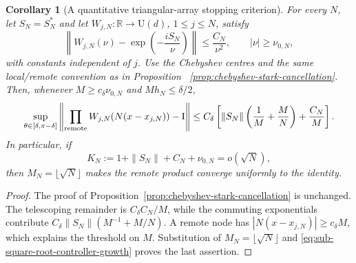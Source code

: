 \documentclass[11pt]{article}
\newtheorem{corollary}[theorem]{Corollary}
\theoremstyle{remark}
\newcommand{\Id}{\mathrm I}
\begin{document}
\begin{corollary}[A quantitative triangular-array stopping criterion]
\label{cor:chebyshev-triangular-array}
For every $N$, let $S_N=S_N^*$ and let
$W_{j,N}:\mathbb R\to\mathrm U(d)$, $1\leq j\leq N$, satisfy
\begin{equation}
 \left\|W_{j,N}(\nu)-\exp\!\left(-\frac{iS_N}{\nu}\right)\right\|
 \leq\frac{C_N}{\nu^2},
 \qquad |\nu|\geq\nu_{0,N},
 \label{eq:triangular-common-stark-tail}
\end{equation}
with constants independent of $j$.  Use the Chebyshev centres and the same
local/remote convention as in Proposition
~\ref{prop:chebyshev-stark-cancellation}.  Then, whenever
$M\geq c_\delta\nu_{0,N}$ and $Mh_N\leq\delta/2$,
\begin{equation}
 \sup_{\theta\in[\delta,\pi-\delta]}
 \left\|
  \prod_{\rm remote}W_{j,N}\!\left(N(x-x_{j,N})\right)-\Id
 \right\|
 \leq
 C_\delta\left[
  \|S_N\|\left(\frac1M+\frac{M}{N}\right)+\frac{C_N}{M}
 \right].
 \label{eq:triangular-chebyshev-remote-bound}
\end{equation}
In particular, if
\begin{equation}
 K_N:=1+\|S_N\|+C_N+\nu_{0,N}=o(\sqrt N),
 \label{eq:sub-square-root-controller-growth}
\end{equation}
then $M_N=\lfloor\sqrt N\rfloor$ makes the remote product converge uniformly
to the identity.
\end{corollary}

\begin{proof}
The proof of Proposition~\ref{prop:chebyshev-stark-cancellation} is unchanged.
The telescoping remainder is $C_\delta C_N/M$, while the commuting
exponentials contribute
$C_\delta\|S_N\|(M^{-1}+M/N)$.  A remote node has
$|N(x-x_{j,N})|\geq c_\delta M$, which explains the threshold on $M$.
Substitution of $M_N=\lfloor\sqrt N\rfloor$ and
\eqref{eq:sub-square-root-controller-growth} proves the last assertion.
\end{proof}
\end{document}
